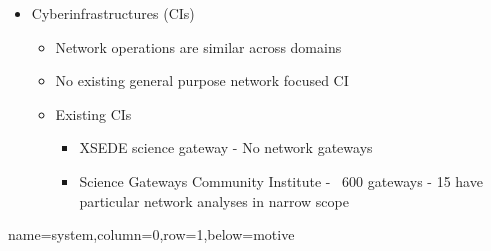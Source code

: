 \documentclass[landscape,paperwidth=70in,paperheight=46in,fontscale=0.225]{baposter} %
\begin{document}
\begin{poster}
{{\begin{itemize}[leftmargin=*,noitemsep,topsep=0pt]
\item Cyberinfrastructures (CIs)
	\begin{itemize}
	\item Network operations are similar across domains
	\item No existing general purpose network focused CI
	\item Existing CIs
	\begin{itemize}
	    \item XSEDE science gateway - No network gateways
	    \item Science Gateways Community Institute - ~600 gateways - 15 have
	    particular network analyses in narrow scope
	\end{itemize}
	\end{itemize}
\end{itemize}
}}

          {name=system,column=0,row=1,below=motive}{

}
\end{poster}
\end{document}
